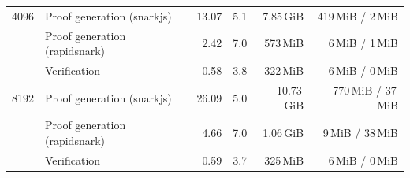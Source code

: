 \begin{table}[t]
{\begin{tabular}{|r|l|r|r|r|r|}
\hline
4096 & Proof generation (snarkjs) & 13.07 & 5.1 & 7.85\,GiB & 419\,MiB / 2\,MiB \\
 & Proof generation (rapidsnark) & 2.42 & 7.0 & 573\,MiB & 6\,MiB / 1\,MiB \\
 & Verification & 0.58 & 3.8 & 322\,MiB & 6\,MiB / 0\,MiB \\
\hline
8192 & Proof generation (snarkjs) & 26.09 & 5.0 & 10.73\,GiB & 770\,MiB / 37\,MiB \\
 & Proof generation (rapidsnark) & 4.66 & 7.0 & 1.06\,GiB & 9\,MiB / 38\,MiB \\
 & Verification & 0.59 & 3.7 & 325\,MiB & 6\,MiB / 0\,MiB \\
\hline
\end{tabular}}
\end{table}
